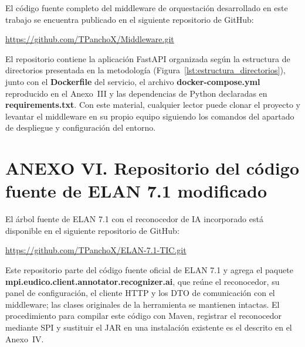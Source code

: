 \documentclass[11pt,a4paper]{article}
\begin{document}
El código fuente completo del middleware de orquestación desarrollado en este trabajo se encuentra publicado en el siguiente repositorio de GitHub:

\begin{center}
\url{https://github.com/TPanchoX/Middleware.git}
\end{center}

El repositorio contiene la aplicación FastAPI organizada según la estructura de directorios presentada en la metodología (Figura~\ref{lst:estructura_directorios}), junto con el \textbf{Dockerfile} del servicio, el archivo \textbf{docker-compose.yml} reproducido en el Anexo~III y las dependencias de Python declaradas en \textbf{requirements.txt}. Con este material, cualquier lector puede clonar el proyecto y levantar el middleware en su propio equipo siguiendo los comandos del apartado de despliegue y configuración del entorno.


\section*{\normalfont ANEXO VI. Repositorio del código fuente de ELAN 7.1 modificado}
\label{anx:repo_elan}

El árbol fuente de ELAN 7.1 con el reconocedor de IA incorporado está disponible en el siguiente repositorio de GitHub:

\begin{center}
\url{https://github.com/TPanchoX/ELAN-7.1-TIC.git}
\end{center}

Este repositorio parte del código fuente oficial de ELAN 7.1 y agrega el paquete \textbf{mpi.eudico.client.annotator.recognizer.ai}, que reúne el reconocedor, su panel de configuración, el cliente HTTP y los DTO de comunicación con el middleware; las clases originales de la herramienta se mantienen intactas. El procedimiento para compilar este código con Maven, registrar el reconocedor mediante SPI y sustituir el JAR en una instalación existente es el descrito en el Anexo~IV.

\end{document}
